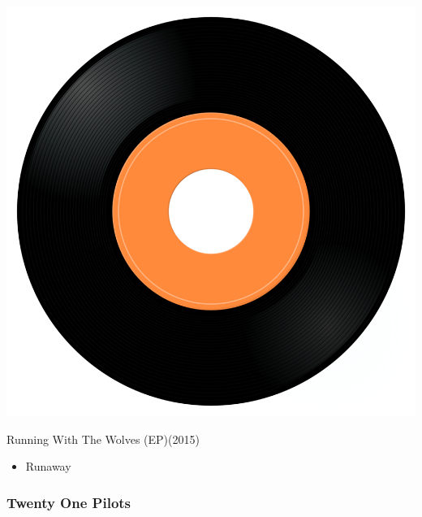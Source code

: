 \begin{minipage}[t]{0.25\textwidth}\vspace{0pt}
\captionsetup{type=figure}
\includegraphics[width=\textwidth]{Images/cover.png}
\caption*{Running With The Wolves (EP)(2015)}
\end{minipage}
\begin{minipage}[t]{0.25\textwidth}\vspace{0pt}
\begin{itemize}[nosep,leftmargin=1em,labelwidth=*,align=left]
	\setlength{\itemsep}{0pt}
	\item Runaway
\end{itemize}
\end{minipage}

\subsubsection{Twenty One Pilots}

